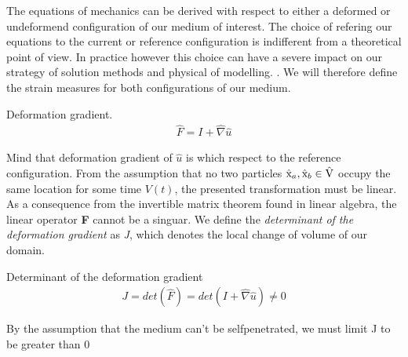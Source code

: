 The equations of mechanics can be derived with respect to either a deformed or undeformend configuration of our medium of interest. The choice of refering our equations to the current or reference configuration is indifferent from a theoretical point of view. In practice however this choice can have a severe impact on our strategy of solution methods and physical of modelling.   \cite{Wriggers2006}. We will therefore define the strain measures for both configurations of our medium.  

\begin{defn}
Deformation gradient. 
\begin{align}
\hat{F} = I + \hat{\nabla} \hat{u} 
\end{align} 
\end{defn}

Mind that deformation gradient of $\hat{u}$ is which respect to the reference configuration. 
From the assumption that no two particles $\text{\^{x}}_a, \text{\^{x}}_b \in \text{\^{V}}$ occupy the same location for some time $V(t)$, the presented transformation must be linear. As a consequence from the invertible matrix theorem found in linear algebra, the linear operator \textbf{F} cannot be a singuar.  
We define the  \textit{determinant of the deformation gradient} as \textit{J}, which denotes the local change of volume of our domain. 

\begin{defn}
Determinant of the deformation gradient
\begin{align}
J = det(\hat{F}) = det( I + \hat{\nabla} \hat{u} ) \neq 0
\end{align} 
\end{defn}


By the assumption that the medium can't be selfpenetrated, we must limit  J to be greater than 0 \cite{Wriggers2006}


